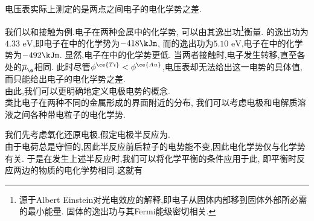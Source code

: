 \documentclass{ctexart}
\begin{document}
\begin{theorem}[6C.1.3 电压表的实际测定值]
    电压表实际上测定的是两点之间电子的电化学势之差.
\end{theorem}
我们以和接触为例.电子在两种金属中的化学势,%
可以由其逸出功\footnote{源于Albert Einstein对光电效应的解释,即电子从固体内部移到固体外部所必需的最小能量.%
固体的逸出功与其Fermi能级密切相关.}衡量.%
的逸出功为$4.33\text{ eV}$,即电子在中的化学势为$-418\kJm$,%
而的逸出功为$5.10\text{ eV}$,电子在中的化学势为$-492\kJm$.%
显然,电子在中的化学势更低.%
当两者接触时,电子发生转移,直至各处的$\overline{\mu}_\e$相同.%
此时尽管$\phi^{\ce{Ti}}<\phi^{\ce{Au}}$,电压表却无法给出这一电势的具体值,%
而只能给出电子的电化学势之差.\\
\indent 由此,我们可以更明确地定义电极电势的概念.\vspace{4pt}\\
\indent 类比电子在两种不同的金属形成的界面附近的分布,%
我们可以考虑电极和电解质溶液之间各种带电粒子的电化学势.
\begin{derivation}
    我们先考虑氧化还原电极.假定电极半反应为.\\
    由于电荷总是守恒的,因此半反应前后粒子的电势能不变,因此电化学势仅与化学势有关.%
    于是在发生上述半反应时,我们可以将化学平衡的条件应用于此,%
    即平衡时反应两边的物质的电化学势相同.这就有
    \[\]
\end{derivation}
\end{document}

